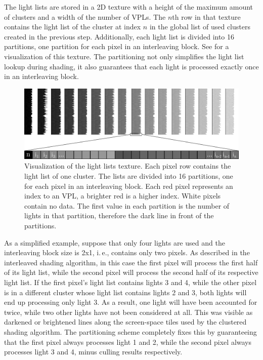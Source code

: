 The light lists are stored in a 2D texture with a height of the maximum amount of clusters and a width of the number of VPLs. The $n$th row in that texture contains the light list of the cluster at index $n$ in the global list of used clusters created in the previous step. Additionally, each light list is divided into 16 partitions, one partition for each pixel in an interleaving block. See  for a visualization of this texture. The partitioning not only simplifies the light list lookup during shading, it also guarantees that each light is processed exactly once in an interleaving block.

\begin{figure}[h]
    \includegraphics[width=\textwidth]{graphics/light_lists}
    \caption{Visualization of the light lists texture. Each pixel row contains the light list of one cluster. The lists are divided into 16 partitions, one for each pixel in an interleaving block. Each red pixel represents an index to an VPL, a brighter red is a higher index. White pixels contain no data. The first value in each partition is the number of lights in that partition, therefore the dark line in front of the partitions.}
    \label{fig:impl:light_lists}
\end{figure}

As a simplified example, suppose that only four lights are used and the interleaving block size is 2x1, i.\,e., contains only two pixels. As described in the interleaved shading algorithm, in this case the first pixel will process the first half of its light list, while the second pixel will process the second half of its respective light list. If the first pixel's light list contains lights 3 and 4, while the other pixel is in a different cluster whose light list contains lights 2 and 3, both lights will end up processing only light 3. As a result, one light will have been accounted for twice, while two other lights have not been considered at all. This was visible as darkened or brightened lines along the screen-space tiles used by the clustered shading algorithm. The partitioning scheme completely fixes this by guaranteeing that the first pixel always processes light 1 and 2, while the second pixel always processes light 3 and 4, minus culling results respectively.

